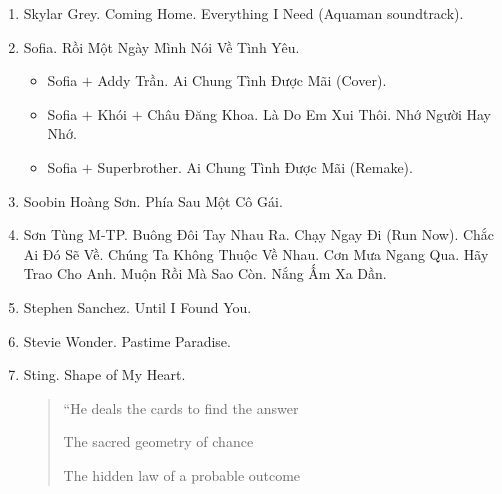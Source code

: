 \documentclass{article}
\begin{document}
\begin{enumerate}
\begin{quotation}
		I'm unstoppable today\hfill$\square$
	\end{quotation}
	\item {\sc Skylar Grey.} Coming Home. Everything I Need (Aquaman soundtrack).
	\item {\sc Sofia.} Rồi Một Ngày Mình Nói Về Tình Yêu.
	\begin{itemize}
		\item {\sc Sofia $+$ Addy Trần.} Ai Chung Tình Được Mãi (Cover).
		\item {\sc Sofia $+$ Khói $+$ Châu Đăng Khoa.} Là Do Em Xui Thôi. Nhớ Người Hay Nhớ.
		\item {\sc Sofia $+$ Superbrother.} Ai Chung Tình Được Mãi (Remake).
	\end{itemize}
	\item {\sc Soobin Hoàng Sơn.} Phía Sau Một Cô Gái.
	\item {\sc Sơn Tùng M-TP.} Buông Đôi Tay Nhau Ra. Chạy Ngay Đi (Run Now). Chắc Ai Đó Sẽ Về. Chúng Ta Không Thuộc Về Nhau. Cơn Mưa Ngang Qua. Hãy Trao Cho Anh. Muộn Rồi Mà Sao Còn. Nắng Ấm Xa Dần.
	\item {\sc Stephen Sanchez.} Until I Found You.
	\item {\sc Stevie Wonder.} Pastime Paradise.
	\item {\sc Sting.} Shape of My Heart.
	\begin{quotation}
		``He deals the cards to find the answer

		The sacred geometry of chance

		The hidden law of a probable outcome


\end{quotation}
\end{enumerate}
\end{document}
